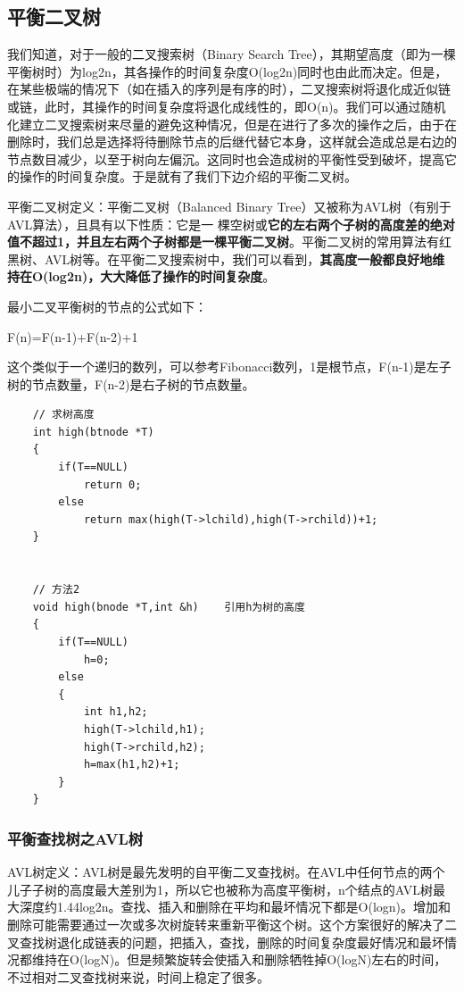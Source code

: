 \documentclass[UTF8,a4paper,12pt]{ctexbook}
\begin{document}
	\subsection{平衡二叉树}
		我们知道，对于一般的二叉搜索树（Binary Search Tree），其期望高度（即为一棵平衡树时）为log2n，其各操作的时间复杂度O(log2n)同时也由此而决定。但是，在某些极端的情况下（如在插入的序列是有序的时），二叉搜索树将退化成近似链或链，此时，其操作的时间复杂度将退化成线性的，即O(n)。我们可以通过随机化建立二叉搜索树来尽量的避免这种情况，但是在进行了多次的操作之后，由于在删除时，我们总是选择将待删除节点的后继代替它本身，这样就会造成总是右边的节点数目减少，以至于树向左偏沉。这同时也会造成树的平衡性受到破坏，提高它的操作的时间复杂度。于是就有了我们下边介绍的平衡二叉树。
		
		平衡二叉树定义：平衡二叉树（Balanced Binary Tree）又被称为AVL树（有别于AVL算法），且具有以下性质：它是一 棵空树或\textbf{它的左右两个子树的高度差的绝对值不超过1，并且左右两个子树都是一棵平衡二叉树}。平衡二叉树的常用算法有红黑树、AVL树等。在平衡二叉搜索树中，我们可以看到，\textbf{其高度一般都良好地维持在O(log2n)，大大降低了操作的时间复杂度}。
		
		最小二叉平衡树的节点的公式如下：
		
		F(n)=F(n-1)+F(n-2)+1
		
		这个类似于一个递归的数列，可以参考Fibonacci数列，1是根节点，F(n-1)是左子树的节点数量，F(n-2)是右子树的节点数量。
		\begin{lstlisting}
	// 求树高度
	int high(btnode *T)  
	{  
		if(T==NULL)  
			return 0;  
		else  
			return max(high(T->lchild),high(T->rchild))+1;  
	}  
	
	
	// 方法2
	void high(bnode *T,int &h)    引用h为树的高度  
	{  
		if(T==NULL)  
			h=0;  
		else  
		{  
			int h1,h2;  
			high(T->lchild,h1);  
			high(T->rchild,h2);  
			h=max(h1,h2)+1;  
		}  
	}  
		\end{lstlisting}
		
		\subsubsection{平衡查找树之AVL树}
			AVL树定义：AVL树是最先发明的自平衡二叉查找树。在AVL中任何节点的两个儿子子树的高度最大差别为1，所以它也被称为高度平衡树，n个结点的AVL树最大深度约1.44log2n。查找、插入和删除在平均和最坏情况下都是O(logn)。增加和删除可能需要通过一次或多次树旋转来重新平衡这个树。这个方案很好的解决了二叉查找树退化成链表的问题，把插入，查找，删除的时间复杂度最好情况和最坏情况都维持在O(logN)。但是频繁旋转会使插入和删除牺牲掉O(logN)左右的时间，不过相对二叉查找树来说，时间上稳定了很多。
			
\end{document}
